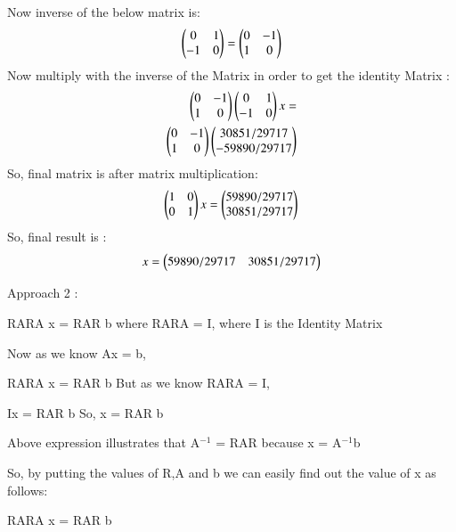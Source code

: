 \documentclass[journal,12pt,twocolumn]{IEEEtran}
\begin{document}
Now inverse of the below matrix is:
\begin{align}
\begin{pmatrix}0 & 1 \\-1 & 0\end{pmatrix} = \begin{pmatrix}0 & -1 \\ 1 & 0\end{pmatrix}
\end{align}
Now multiply with the inverse of the Matrix in order to get the identity Matrix :
\begin{align}
\begin{pmatrix}0 & -1 \\ 1 & 0\end{pmatrix}
\begin{pmatrix}0 & 1 \\ -1 & 0\end{pmatrix} x = \nonumber \\ 
\begin{pmatrix}0 & -1 \\ 1 & 0\end{pmatrix}
\begin{pmatrix}30851/29717 \\ -59890/29717\end{pmatrix}
\end{align}
So, final matrix is after matrix multiplication:
\begin{align}
\begin{pmatrix}1 & 0 \\ 0 & 1\end{pmatrix} x =
\begin{pmatrix}59890/29717 \\ 30851/29717\end{pmatrix}
\end{align}
So, final result is :
\begin{align}
x = \begin{pmatrix}59890/29717 & 30851/29717\end{pmatrix}
\end{align}

Approach 2 :

RARA x = RAR b where RARA = I, where I is the Identity Matrix

Now as we know Ax = b,

RARA x = RAR b
But as we know RARA = I,

Ix = RAR b
So, x = RAR b

Above expression illustrates that
A$^ {-1}$ = RAR because x = A$^ {-1}$b

So, by putting the values of R,A and b we can easily find out the value of x as follows:

RARA x = RAR b
\end{document}
